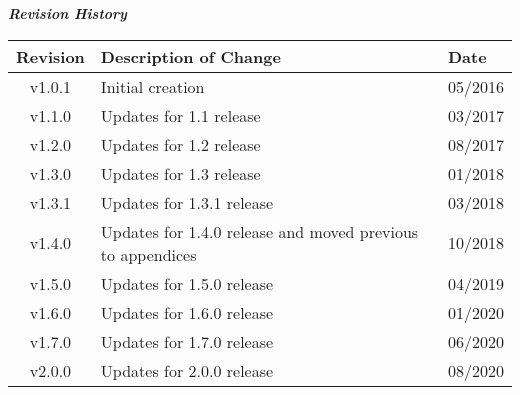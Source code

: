 \maketitle
\thispagestyle{empty}
\newpage

\begin{center}
	\textit{\textbf{Revision History}}
	\begin{table}[H]
		\label{table:revisions} %
		\begin{tabularx}{\textwidth}{|c|X|l|}
			\hline
			\rowcolor{blue}
			\textbf{Revision} & \textbf{Description of Change} & \textbf{Date} \\
		    \hline
			v1.0.1 & Initial creation & 05/2016 \\
			\hline
			v1.1.0 & Updates for 1.1 release & 03/2017 \\
			\hline
			v1.2.0 & Updates for 1.2 release & 08/2017 \\
			\hline
			v1.3.0 & Updates for 1.3 release & 01/2018 \\
			\hline
			v1.3.1 & Updates for 1.3.1 release & 03/2018 \\
			\hline
			v1.4.0 & Updates for 1.4.0 release and moved previous to appendices & 10/2018 \\
			\hline
			v1.5.0 & Updates for 1.5.0 release & 04/2019 \\
			\hline
			v1.6.0 & Updates for 1.6.0 release & 01/2020 \\
			\hline
			v1.7.0 & Updates for 1.7.0 release & 06/2020 \\
			\hline
			v2.0.0 & Updates for 2.0.0 release & 08/2020 \\
			\hline
		\end{tabularx}
	\end{table}
\end{center}
\newpage

\tableofcontents
\renewcommand\thesection{\Roman{section}}
\renewcommand\thesubsection{\thesection-\arabic{subsection}}
\newpage
{}
